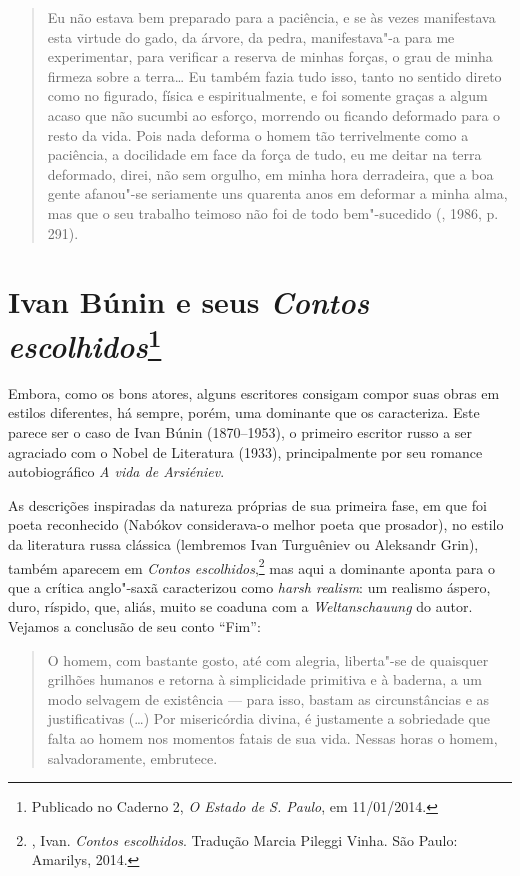 \begin{quotation}
Eu não estava bem preparado para a paciência, e se às vezes manifestava esta virtude do gado, da árvore, da pedra, manifestava"-a para me experimentar, para verificar a reserva de minhas forças, o grau de minha firmeza sobre a terra\ldots{} Eu também fazia tudo isso, tanto no sentido direto como no figurado, física e espiritualmente, e foi somente graças a algum acaso que não sucumbi ao esforço, morrendo ou ficando deformado para o resto da vida. Pois nada deforma o homem tão terrivelmente como a paciência, a docilidade em face da força de tudo, eu me deitar na terra deformado, direi, não sem orgulho, em minha hora derradeira, que a boa gente afanou"-se seriamente uns quarenta anos em deformar a minha alma, mas que o seu trabalho teimoso não foi de todo bem"-sucedido (, 1986, p. 291).
\end{quotation}

\chapter{Ivan Búnin e seus \emph{Contos escolhidos}\footnote{Publicado no Caderno 2, \emph{O Estado de S. Paulo}, em 11/01/2014.}}

Embora, como os bons atores, alguns escritores consigam compor
suas obras em estilos diferentes, há sempre, porém, uma dominante
que os caracteriza. Este parece ser o caso de Ivan Búnin
(1870--1953), o primeiro escritor russo a ser agraciado com o
Nobel de Literatura (1933), principalmente por seu romance
autobiográfico \emph{A vida de Arsiéniev}.

As descrições inspiradas da natureza próprias de sua primeira
fase, em que foi poeta reconhecido (Nabókov considerava-o melhor
poeta que prosador), no estilo da literatura russa clássica
(lembremos Ivan Turguêniev ou Aleksandr Grin), também aparecem
em \emph{Contos escolhidos},\footnote{, Ivan.
\emph{Contos escolhidos}. Tradução Marcia Pileggi Vinha. São
Paulo: Amarilys, 2014.} mas aqui a dominante aponta para o que
a crítica anglo"-saxã caracterizou como \emph{harsh realism}:
um realismo áspero, duro, ríspido, que, aliás, muito se coaduna
com a \emph{Weltanschauung} do autor. Vejamos a conclusão de
seu conto ``Fim'': 

\begin{quotation}
O homem, com bastante gosto, até com alegria, liberta"-se de
quaisquer grilhões humanos e retorna à simplicidade primitiva e
à baderna, a um modo selvagem de existência --- para isso, bastam
as circunstâncias e as justificativas (\ldots{}) Por misericórdia
divina, é justamente a sobriedade que falta ao homem nos momentos
fatais de sua vida. Nessas horas o homem, salvadoramente,
embrutece.
\end{quotation}

